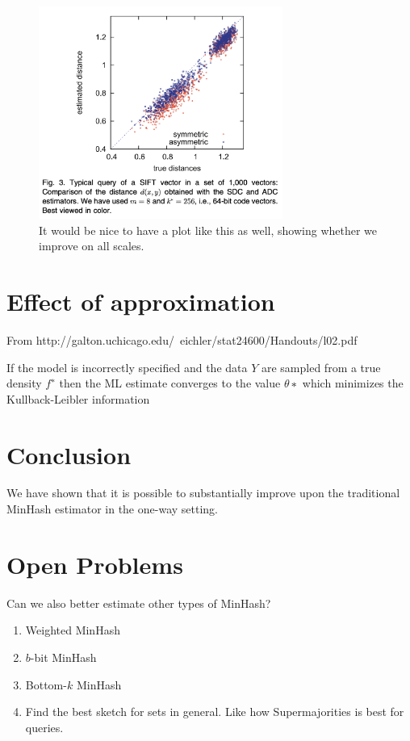 {\begin{figure}[h]
   \centering
   \includegraphics[width=8cm]{figures/estimates}
\caption{It would be nice to have a plot like this as well, showing whether we improve on all scales.}
\end{figure}



\section{Effect of approximation}
From http://galton.uchicago.edu/~eichler/stat24600/Handouts/l02.pdf

If the model is incorrectly specified and the data $Y$ are sampled from a true
density $f^∗$ then the ML estimate converges to the value $\theta∗$ which minimizes
the Kullback-Leibler information
\section{Conclusion}

We have shown that it is possible to substantially improve upon the traditional MinHash estimator in the one-way setting.

\section{Open Problems}

Can we also better estimate other types of MinHash?
\begin{enumerate}
   \item Weighted MinHash
   \item $b$-bit MinHash
   \item Bottom-$k$ MinHash
   \item Find the best sketch for sets in general. Like how Supermajorities is best for queries.
\end{enumerate}


}
